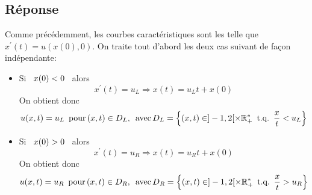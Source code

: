 \documentclass[
	french,
	11pt, %
]{fphw}
\newcommand{\hquad}{\hspace{0.5em}} %
\begin{document}
\subsection*{Réponse}

Comme précédemment, les courbes  caractéristiques sont les telle que $ x^\prime(t) = u(x(0),0) $. 
On traite tout d'abord les deux cas suivant de façon indépendante:
\begin{itemize}
	\item Si $\hquad x(0) < 0 \hquad$ alors
	$$ x^\prime (t) = u_L \Rightarrow x(t) = u_L t+x(0)$$
	On obtient donc 
	$$ u(x,t) = u_L \hquad \text{pour} \, (x,t) \in D_L, \hquad \text{avec} \, D_L= \left\{ (x,t) \in ]-1,2[ \times \mathbb{R}_+^* \hquad \text{t.q.} \hquad \frac{x}{t} < u_L \right\} $$
	\item Si $\hquad x(0) > 0 \hquad$ alors
	$$ x^\prime (t) = u_R \Rightarrow x(t) = u_R t+x(0)$$
	On obtient donc 
	$$ u(x,t) = u_R \hquad \text{pour} \, (x,t) \in D_R, \hquad \text{avec} \, D_R= \left\{ (x,t) \in ]-1,2[ \times \mathbb{R}_+^* \hquad \text{t.q.} \hquad \frac{x}{t} > u_R \right\} $$
\end{itemize}
\end{document}
